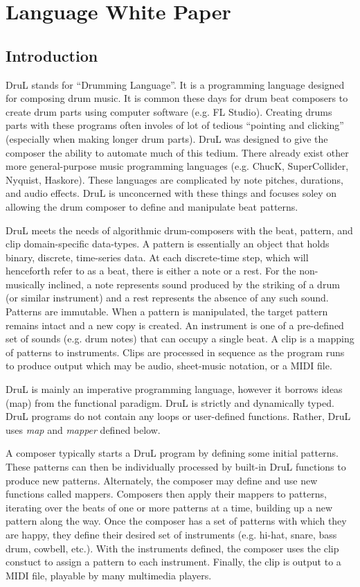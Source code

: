 
\chapter{Language White Paper}

\section{Introduction}

DruL stands for ``Drumming Language''.  It is a programming language designed for composing drum music.  It is common these days for drum beat composers to create drum parts using computer software (e.g. FL Studio).  Creating drums parts with these programs often involes of lot of tedious ``pointing and clicking'' (especially when making longer drum parts).  DruL was designed to give the composer the ability to automate much of this tedium.  There already exist other more general-purpose music programming languages (e.g. ChucK, SuperCollider, Nyquist, Haskore).  These languages are complicated by note pitches, durations, and audio effects.  DruL is unconcerned with these things and focuses soley on allowing the drum composer to define and manipulate beat patterns.

DruL meets the needs of algorithmic drum-composers with the beat, pattern, and clip domain-specific data-types.
A pattern is essentially an object that holds binary, discrete, time-series data.  At each discrete-time step, which will henceforth refer to as a beat, there is either a note or a rest.  For the non-musically inclined, a note represents sound produced by the striking of a drum (or similar instrument) and a rest represents the absence of any such sound.  Patterns are immutable.  When a pattern is manipulated, the target pattern remains intact and a new copy is created.
An instrument is one of a pre-defined set of sounds (e.g. drum notes) that can occupy a single beat.
A clip is a mapping of patterns to instruments. Clips are processed in sequence as the program runs to produce output which may be audio, sheet-music notation, or a MIDI file.

DruL is mainly an imperative programming language, however it borrows ideas (map) from the functional paradigm.
DruL is strictly and dynamically typed.
DruL programs do not contain any loops or user-defined functions.
Rather, DruL uses \textit{map} and \textit{mapper} defined below.

A composer typically starts a DruL program by defining some initial patterns.  These patterns can then be individually processed by built-in DruL functions to produce new patterns.  Alternately, the composer may define and use new functions called mappers.  Composers then apply their mappers to patterns, iterating over the beats of one or more patterns at a time, building up a new pattern along the way.  Once the composer has a set of patterns with which they are happy, they define their desired set of instruments (e.g. hi-hat, snare, bass drum, cowbell, etc.).  With the instruments defined, the composer uses the clip constuct to assign a pattern to each instrument.  Finally, the clip is output to a MIDI file, playable by many multimedia players.

